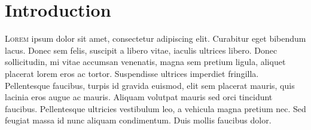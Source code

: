 \section{Introduction}

\lettrine[nindent=0em,lines=3]{L}{orem} ipsum dolor sit amet, consectetur adipiscing elit. Curabitur eget bibendum lacus. Donec sem felis, suscipit a libero vitae, iaculis ultrices libero. Donec sollicitudin, mi vitae accumsan venenatis, magna sem pretium ligula, aliquet placerat lorem eros ac tortor. Suspendisse ultrices imperdiet fringilla. Pellentesque faucibus, turpis id gravida euismod, elit sem placerat mauris, quis lacinia eros augue ac mauris. Aliquam volutpat mauris sed orci tincidunt faucibus. Pellentesque ultricies vestibulum leo, a vehicula magna pretium nec. Sed feugiat massa id nunc aliquam condimentum. Duis mollis faucibus dolor.